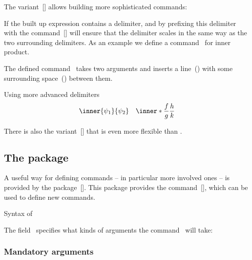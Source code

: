 The variant~[\comname] allows building more sophisticated commands:
If the built up expression contains a delimiter, and by prefixing this delimiter with the command~[\comname] will ensure that the delimiter scales in the same way as the two surrounding delimiters.
As an example we define a command~ for inner product. 
The defined command~ takes two arguments and inserts a line~() with some surrounding space~(\comname{,}) between them.
\begin{showlatex}{Using more advanced delimiters}
\[
  \inner{\psi_1}{\psi_2}
  \quad
  \inner*{\frac{f}{g}}{\frac{h}{k}}
\]
\end{showlatex}
There is also the variant~[\comname] that is even more flexible than .



\subsection{The package~}

A useful way for defining commands -- in particular more involved ones -- is provided by the package~[\packname].
This package provides the command~[\comname], which can be used to define new commands.
\begin{showcode}{Syntax of }
\end{showcode}
The field~ specifies what kinds of arguments the command~ will take:

\subsubsection{Mandatory arguments}


